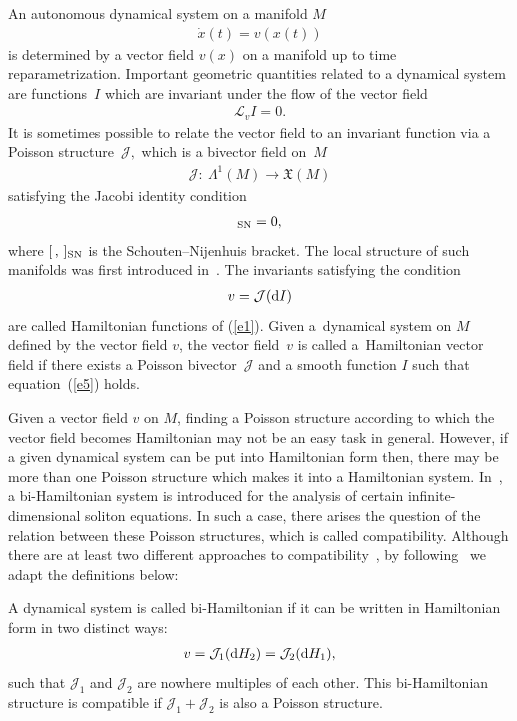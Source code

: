 \documentclass[pdftex]{sigma}
\numberwithin{equation}{section}
\begin{document}
An autonomous dynamical system on a manifold $M$
\begin{gather}
\dot{x}(t) =v(x(t))\label{e1}
\end{gather}
is determined by a vector f\/ield $v(x) $ on a manifold up to time reparametrization. Important geometric quantities related to a dynamical system are functions~$I$ which are invariant under the f\/low of the vector f\/ield
\begin{gather*}
\mathcal{L}_{v}I=0.
\end{gather*}
It is sometimes possible to relate the vector f\/ield to an invariant function via a Poisson structure~$\mathcal{J},$ which is a bivector f\/ield on~$M$
\begin{gather*}
\mathcal{J}\colon \ \Lambda ^{1}(M)\rightarrow \mathfrak{X}(M)
\end{gather*}
satisfying the Jacobi identity condition
\begin{gather*}
 [ \mathcal{J},\mathcal{J} ] _{\rm SN}=0,
\end{gather*}
where $[\, ,\,] _{\rm SN}$ is the Schouten--Nijenhuis bracket. The local structure of such manifolds was f\/irst introduced in~\cite{Wein}. The invariants satisfying the condition
\begin{gather}
v=\mathcal{J}({\rm d}I) \label{e5}
\end{gather}
are called Hamiltonian functions of (\ref{e1}). Given a~dynamical system on $M$ def\/ined by the vector f\/ield $v$, the vector f\/ield~$v$ is called a~Hamiltonian vector f\/ield if there exists a Poisson bivector~$\mathcal{J}$ and a smooth function $I$ such that equation~(\ref{e5}) holds.

 Given a vector f\/ield $v$ on $M$, f\/inding a Poisson structure according to which the vector f\/ield becomes Hamiltonian may not be an easy task in general. However, if a given dynamical system can be put into Hamiltonian form then, there may be more than one Poisson structure which makes it into a Hamiltonian system. In~\cite{Magri}, a bi-Hamiltonian system is introduced for the analysis of certain inf\/inite-dimensional soliton equations. In such a case, there arises the question of the relation between these Poisson structures, which is called compatibility. Although there are at least two dif\/ferent approaches to compatibility~\cite{Santo}, by following~\cite{Olver} we adapt the def\/initions below:

\begin{Definition}\label{definition1}
A dynamical system is called bi-Hamiltonian if it can be written in Hamiltonian form in two distinct ways:
\begin{gather}
v=\mathcal{J}_{1}( {\rm d}H_{2}) =\mathcal{J}_{2}( {\rm d}H_{1}),\label{e6}
\end{gather}
such that $\mathcal{J}_{1}$ and $\mathcal{J}_{2}$ are nowhere multiples of each other. This bi-Hamiltonian structure is compatible if $\mathcal{J}_{1}+\mathcal{J}_{2}$ is also a Poisson structure.
\end{Definition}
\end{document}
